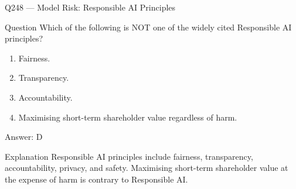 \documentclass[aspectratio=169,8pt]{beamer}
\begin{document}
																																																							\begin{frame}{Q248 --- Model Risk: Responsible AI Principles}
																																																								\begin{block}{Question}
																																																									Which of the following is NOT one of the widely cited Responsible AI principles?
																																																									\begin{enumerate}
																																																										\item Fairness.
																																																										\item Transparency.
																																																										\item Accountability.
																																																										\item Maximising short-term shareholder value regardless of harm.
																																																									\end{enumerate}  \end{block}
																																																									\begin{exampleblock}{Answer: D}\end{exampleblock}
																																																									\begin{block}{Explanation}
																																																										Responsible AI principles include fairness, transparency, accountability, privacy, and safety. Maximising short-term shareholder value at the expense of harm is contrary to Responsible AI.
																																																									\end{block}
																																																								\end{frame}
																																																								
\end{document}
